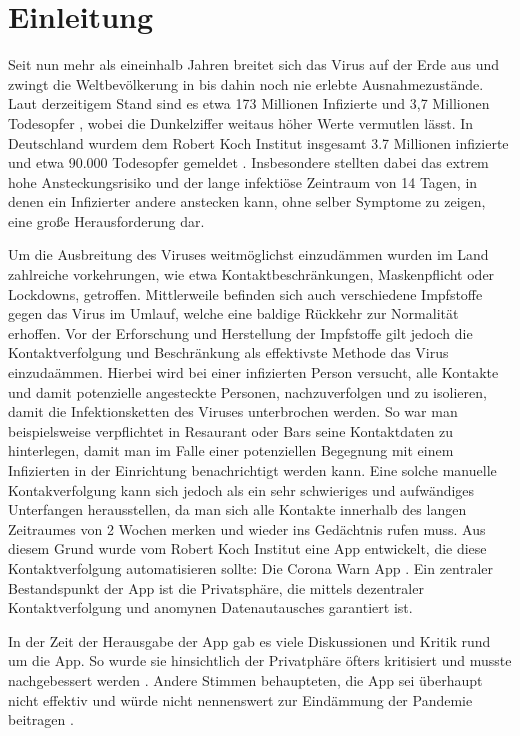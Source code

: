 \documentclass[conference]{IEEEtran}
\begin{document}
\section{Einleitung}
Seit nun mehr als eineinhalb Jahren breitet sich das Virus auf der Erde aus und zwingt die Weltbevölkerung in bis dahin noch nie erlebte Ausnahmezustände.
Laut derzeitigem Stand sind es etwa 173 Millionen Infizierte und 3,7 Millionen Todesopfer \cite{CoronaZahlenWorld}, wobei die Dunkelziffer weitaus höher Werte vermutlen lässt. 
In Deutschland wurdem dem Robert Koch Institut insgesamt 3.7 Millionen infizierte und etwa 90.000 Todesopfer gemeldet \cite{CoronaZahlenDe}. 
Insbesondere stellten dabei das extrem hohe Ansteckungsrisiko und der lange infektiöse Zeintraum von 14 Tagen, in denen ein Infizierter andere anstecken kann, ohne selber Symptome zu zeigen, eine große Herausforderung dar.

Um die Ausbreitung des Viruses weitmöglichst einzudämmen wurden im Land zahlreiche vorkehrungen, wie etwa Kontaktbeschränkungen, Maskenpflicht oder Lockdowns, getroffen. 
Mittlerweile befinden sich auch verschiedene Impfstoffe gegen das Virus im Umlauf, welche eine baldige Rückkehr zur Normalität erhoffen.
Vor der Erforschung und Herstellung der Impfstoffe gilt jedoch die Kontaktverfolgung und Beschränkung als effektivste Methode das Virus einzudaämmen. 
Hierbei wird bei einer infizierten Person versucht, alle Kontakte und damit potenzielle angesteckte Personen, nachzuverfolgen und zu isolieren, damit die Infektionsketten des Viruses unterbrochen werden.
So war man beispielsweise verpflichtet in Resaurant oder Bars seine Kontaktdaten zu hinterlegen, damit man im Falle einer potenziellen Begegnung mit einem Infizierten in der Einrichtung benachrichtigt werden kann.
Eine solche manuelle Kontakverfolgung kann sich jedoch als ein sehr schwieriges und aufwändiges Unterfangen herausstellen, da man sich alle Kontakte innerhalb des langen Zeitraumes von 2 Wochen merken und wieder ins Gedächtnis rufen muss.
Aus diesem Grund wurde vom Robert Koch Institut eine App entwickelt, die diese Kontaktverfolgung automatisieren sollte: Die Corona Warn App \cite{}. Ein zentraler Bestandspunkt der App ist die Privatsphäre, die mittels dezentraler Kontaktverfolgung und anomynen Datenautausches garantiert ist.

In der Zeit der Herausgabe der App gab es viele Diskussionen und Kritik rund um die App. So wurde sie hinsichtlich der Privatphäre öfters kritisiert und musste nachgebessert werden \cite{}. 
Andere Stimmen behaupteten, die App sei überhaupt nicht effektiv und würde nicht nennenswert zur Eindämmung der Pandemie beitragen \cite{}. 
\end{document}
